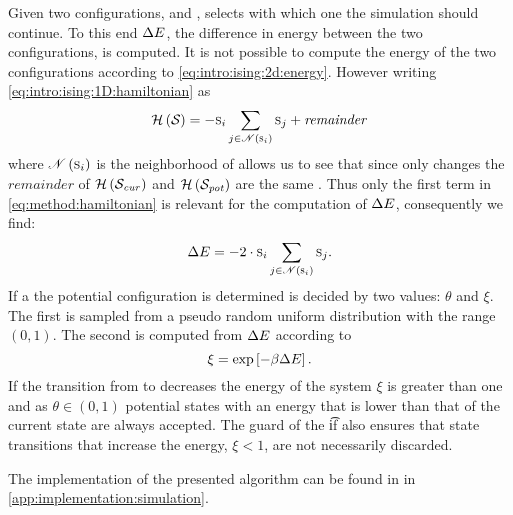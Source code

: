 Given two configurations,  and ,  selects with which one the simulation should continue. To this end $\Delta E$, the difference in energy between the two configurations, is computed. It is not possible to compute the energy of the two configurations according to \cref{eq:intro:ising:2d:energy}. However writing \cref{eq:intro:ising:1D:hamiltonian} as
	\begin{equation}\label{eq:method:hamiltonian}
			\mathcal{H}\left(\mathcal{S}_{}\right) = - \textsc{s}_{i} \sum_{j \in \mathscr{N}\left(\textsc{s}_{i}\right)} \textsc{s}_{j} + \mathit{remainder}
	\end{equation}
where $\mathscr{N}\left(\textsc{s}_{i}\right)$ is the neighborhood of  allows us to see that since only  changes the $\mathit{remainder}$ of $\mathcal{H}\left(\mathcal{S}_{\mathit{cur}}\right)$ and $\mathcal{H}\left(\mathcal{S}_{\mathit{pot}}\right)$ are the same \cite{kenzel1997physics}. Thus only the first term in \cref{eq:method:hamiltonian} is relevant for the computation of $\Delta E$, consequently we find:
\begin{equation}\label{eq:method:deltaEnergy}
	\Delta E = - 2 \cdot \textsc{s}_{i} \sum_{j \in \mathscr{N}\left(\textsc{s}_{i}\right)} \textsc{s}_{j}.
\end{equation}
If a the potential configuration is determined is decided by two values: $\theta$ and $\xi$. The first is sampled from a pseudo random uniform distribution with the range $\left(0, 1\right)$. The second is computed from $\Delta E$ according to
\begin{equation}
	\xi = \exp\left[- \beta\Delta E \right].
\end{equation}
If the transition from  to  decreases the energy of the system $\xi$ is greater than one and as \mbox{$\theta \in \left(0, 1\right)$} potential states with an energy that is lower than that of the current state are always accepted. The guard of the \t{if} also ensures that state transitions that increase the energy, \ie \mbox{$\xi < 1$}, are not necessarily discarded.

The implementation of the presented algorithm can be found in  in \cref{app:implementation:simulation}.